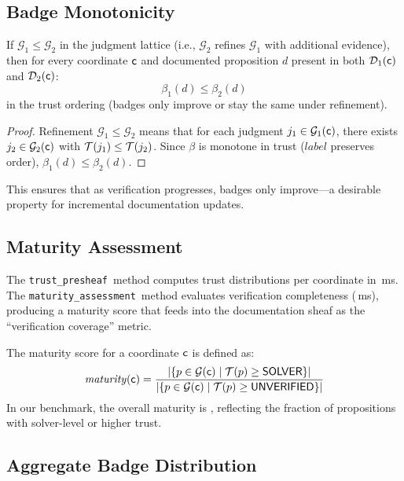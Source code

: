 \documentclass[11pt]{article}
\newcommand{\TrustPresheafAPI}{\texttt{trust\_presheaf}}
\newcommand{\MaturityAPI}{\texttt{maturity\_assessment}}
\newcommand{\DocSheaf}{\mathcal{D}}
\newcommand{\BadgeFunc}{\beta}                        %
\begin{document}
\subsection{Badge Monotonicity}

\begin{lemma}\label{lem:badge-mono}
If $\mathcal{G}_1 \leq \mathcal{G}_2$ in the judgment lattice (i.e.,
$\mathcal{G}_2$ refines $\mathcal{G}_1$ with additional evidence),
then for every coordinate $\mathsf{c}$ and documented proposition $d$
present in both $\DocSheaf_1(\coord)$ and $\DocSheaf_2(\coord)$:
\[
  \BadgeFunc_1(d) \leq \BadgeFunc_2(d)
\]
in the trust ordering (badges only improve or stay the same under
refinement).
\end{lemma}

\begin{proof}
Refinement $\mathcal{G}_1 \leq \mathcal{G}_2$ means that for each
judgment $j_1 \in \mathcal{G}_1(\mathsf{c})$, there exists
$j_2 \in \mathcal{G}_2(\mathsf{c})$ with $\mathcal{T}(j_1) \leq \mathcal{T}(j_2)$.
Since $\BadgeFunc$ is monotone in trust ($\mathit{label}$ preserves
order), $\BadgeFunc_1(d) \leq \BadgeFunc_2(d)$.
\end{proof}

This ensures that as verification progresses, badges only improve---a
desirable property for incremental documentation updates.

\subsection{Maturity Assessment}
The \TrustPresheafAPI\ method computes trust distributions per
coordinate in \compProfTrustPresheafMeanMs\,ms.  The \MaturityAPI\
method evaluates verification completeness
(\compProfMaturityAssessmentMeanMs\,ms), producing a maturity score
that feeds into the documentation sheaf as the ``verification
coverage'' metric.

The maturity score for a coordinate $\mathsf{c}$ is defined as:
\[
  \mathit{maturity}(\mathsf{c}) = \frac{|\{p \in \mathcal{G}(\mathsf{c})
  \mid \mathcal{T}(p) \geq \mathsf{SOLVER}\}|}{|\{p \in \mathcal{G}(\mathsf{c})
  \mid \mathcal{T}(p) \geq \mathsf{UNVERIFIED}\}|}
\]
In our benchmark, the overall maturity is \ppLIXtrustSolverPct,
reflecting the fraction of propositions with solver-level or higher
trust.

\subsection{Aggregate Badge Distribution}
\end{document}
